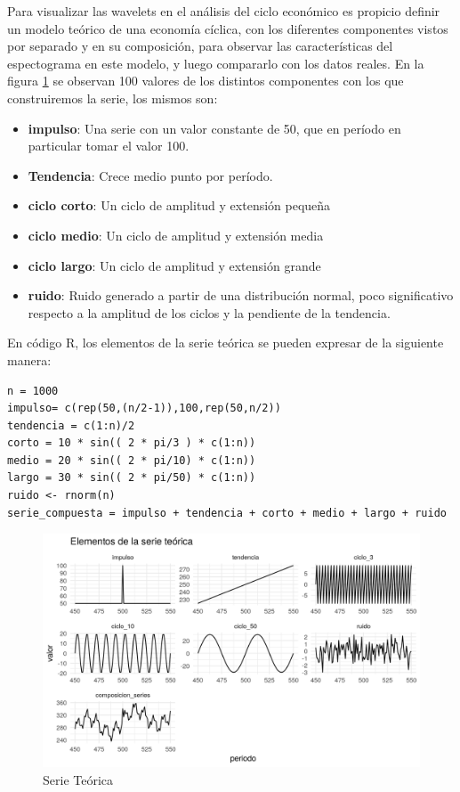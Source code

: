 \documentclass[a4paper]{article}
\begin{document}
Para visualizar las wavelets en el análisis del ciclo económico es propicio definir un modelo teórico de una economía cíclica, con los diferentes componentes vistos por separado y en su composición, para observar las características del espectograma en este modelo,  y luego compararlo con los datos reales. 
En la figura \ref{fig:serie_teorica} se observan 100 valores de los distintos componentes con los que construiremos la serie, los mismos son:

\begin{itemize}
	\item \textbf{impulso}: Una serie con un valor constante de 50, que en período en particular tomar el valor 100.
	\item \textbf{Tendencia}: Crece medio punto por período.
	\item \textbf{ciclo corto}: Un ciclo de amplitud y extensión pequeña
	\item \textbf{ciclo medio}: Un ciclo de amplitud y extensión media
	\item \textbf{ciclo largo}: Un ciclo de amplitud y extensión grande
	\item \textbf{ruido}: Ruido generado a partir de una distribución normal, poco significativo respecto a la amplitud de los ciclos y la pendiente de la tendencia.
\end{itemize}

En código R, los elementos de la serie teórica se pueden expresar de la siguiente manera:

\begin{lstlisting}
n = 1000
impulso= c(rep(50,(n/2-1)),100,rep(50,n/2))
tendencia = c(1:n)/2
corto = 10 * sin(( 2 * pi/3 ) * c(1:n))
medio = 20 * sin(( 2 * pi/10) * c(1:n))
largo = 30 * sin(( 2 * pi/50) * c(1:n))
ruido <- rnorm(n)
serie_compuesta = impulso + tendencia + corto + medio + largo + ruido
\end{lstlisting}


\begin{figure}[H]
	\centering
	\includegraphics[width=\linewidth]{serie_teorica.PNG}
	\caption{Serie Teórica} \label{fig:serie_teorica}
\end{figure}
\end{document}
